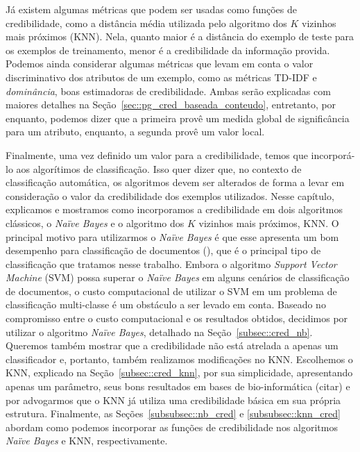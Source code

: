 
Já existem algumas métricas que podem ser usadas como funções de credibilidade, como a distância média utilizada pelo algoritmo dos $K$ vizinhos mais próximos (\textsc{KNN}). Nela, quanto maior é a distância do exemplo de teste para os exemplos de treinamento, menor é a credibilidade da informação provida. Podemos ainda considerar algumas métricas que levam em conta o valor discriminativo dos atributos de um exemplo, como as métricas \textsc{TD-IDF} e \textit{dominância}, boas estimadoras de credibilidade. Ambas serão explicadas com maiores detalhes na Seção~\ref{sec::pg_cred_baseada_conteudo}, entretanto, por enquanto, podemos dizer que a primeira provê um medida global de significância para um atributo, enquanto, a segunda provê um valor local. 

Finalmente, uma vez definido um valor para a credibilidade, temos que incorporá-lo aos algorítimos de classificação. Isso quer dizer que, no contexto de classificação automática, os algoritmos devem ser alterados de forma a levar em consideração o valor da credibilidade dos exemplos utilizados. Nesse capítulo, explicamos e mostramos como incorporamos a credibilidade em dois algoritmos clássicos, o \textit{Naïve Bayes} e o algoritmo dos $K$ vizinhos mais próximos, \textsc{KNN}. O principal motivo para utilizarmos o \textit{Naïve Bayes} é que esse apresenta um bom desempenho  para classificação de documentos (\cite{salles10}), que é o principal tipo de classificação que tratamos nesse trabalho. Embora o algoritmo \textit{Support Vector Machine} (\textsc{SVM}) possa superar o \textit{Naïve Bayes} em alguns cenários de classificação de documentos, o custo computacional de utilizar o \textsc{SVM} em um problema de classificação multi-classe é um obstáculo a ser levado em conta. Baseado no compromisso entre o custo computacional e os resultados obtidos, decidimos por utilizar o algoritmo \textit{Naïve Bayes}, detalhado na Seção~\ref{subsec::cred_nb}. Queremos também mostrar que a credibilidade não está atrelada a apenas um classificador e, portanto, também realizamos modificações no \textsc{KNN}. Escolhemos o \textsc{KNN}, explicado na Seção~\ref{subsec::cred_knn}, por sua simplicidade, apresentando apenas um parâmetro, seus bons resultados em bases de bio-informática (citar) e por advogarmos que o \textsc{KNN} já utiliza uma credibilidade básica em sua própria estrutura. Finalmente, as Seções~\ref{subsubsec::nb_cred} e \ref{subsubsec::knn_cred} abordam como podemos incorporar as funções de credibilidade nos algoritmos \textit{Naïve Bayes} e \textsc{KNN}, respectivamente.

